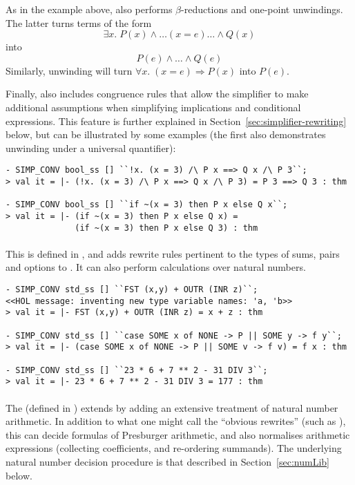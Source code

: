 As in the example above,  also performs
$\beta$-reductions and one-point unwindings.  The latter turns terms
of the form \[
\exists x.\;P(x)\land\dots (x = e) \dots\land Q(x)
\]
into
\[
P(e) \land \dots \land Q(e)
\]
Similarly, unwinding will turn $\forall x.\;(x = e)
\Rightarrow P(x)$ into $P(e)$.

Finally,  also includes congruence rules that allow
the simplifier to make additional assumptions when simplifying
implications and conditional expressions.  This feature is further
explained in Section~\ref{sec:simplifier-rewriting} below, but can be
illustrated by some examples (the first also demonstrates unwinding
under a universal quantifier):
\begin{session}
\begin{verbatim}
- SIMP_CONV bool_ss [] ``!x. (x = 3) /\ P x ==> Q x /\ P 3``;
> val it = |- (!x. (x = 3) /\ P x ==> Q x /\ P 3) = P 3 ==> Q 3 : thm

- SIMP_CONV bool_ss [] ``if ~(x = 3) then P x else Q x``;
> val it = |- (if ~(x = 3) then P x else Q x) =
              (if ~(x = 3) then P x else Q 3) : thm
\end{verbatim}
\end{session}

\paragraph{}
%
%
This \simpset{} is defined in , and adds rewrite rules
pertinent to the types of sums, pairs and options to .
It can also perform calculations over natural numbers.
\begin{session}
\begin{verbatim}
- SIMP_CONV std_ss [] ``FST (x,y) + OUTR (INR z)``;
<<HOL message: inventing new type variable names: 'a, 'b>>
> val it = |- FST (x,y) + OUTR (INR z) = x + z : thm

- SIMP_CONV std_ss [] ``case SOME x of NONE -> P || SOME y -> f y``;
> val it = |- (case SOME x of NONE -> P || SOME v -> f v) = f x : thm

- SIMP_CONV std_ss [] ``23 * 6 + 7 ** 2 - 31 DIV 3``;
> val it = |- 23 * 6 + 7 ** 2 - 31 DIV 3 = 177 : thm
\end{verbatim}
\end{session}

\paragraph{}
%
%
The  \simpset{} (defined in ) extends
 by adding an extensive treatment of natural number
arithmetic.  In addition to what one might call the ``obvious
rewrites'' (such as ), this \simpset{} can
decide formulas of Presburger arithmetic, and also normalises
arithmetic expressions (collecting coefficients, and re-ordering
summands).  The underlying natural number decision procedure is that
described in Section~\ref{sec:numLib} below.

